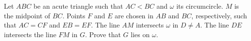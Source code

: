 Let $ABC$ be an acute triangle such that $AC<BC$ and $\omega$ its circumcircle. $M$ is the midpoint of $BC$. Points $F$ and $E$ are chosen in $AB$ and $BC$, respectively, such that $AC=CF$ and $EB=EF$. The line $AM$ intersects $\omega$ in $D\neq A$. The line $DE$ intersects the line $FM$ in $G$. Prove that $G$ lies on $\omega$.
